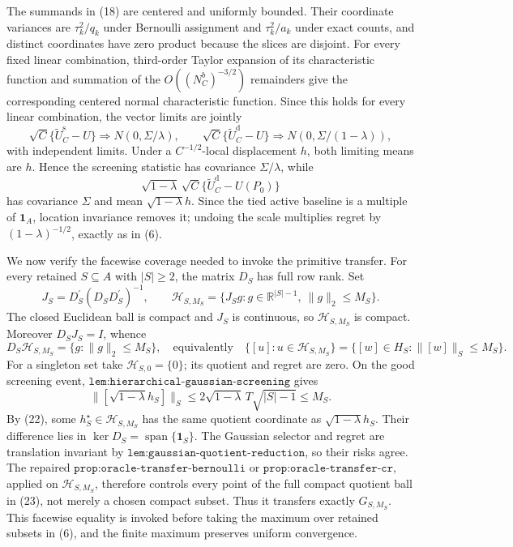 The summands in (18) are centered and uniformly bounded.  Their coordinate variances are \(\tau_k^2/q_k\) under Bernoulli assignment and \(\tau_k^2/a_k\) under exact counts, and distinct coordinates have zero product because the slices are disjoint.  For every fixed linear combination, third-order Taylor expansion of its characteristic function and summation of the \(O((N_C^b)^{-3/2})\) remainders give the corresponding centered normal characteristic function.  Since this holds for every linear combination, the vector limits are jointly
\[
\sqrt C\{\widetilde U_C^{\mathrm s}-U\}
\Rightarrow N(0,\Sigma/\lambda),
\qquad
\sqrt C\{\widetilde U_C^{\mathrm d}-U\}
\Rightarrow N(0,\Sigma/(1-\lambda)),                             \tag{19}
\]
with independent limits.  Under a \(C^{-1/2}\)-local displacement \(h\), both limiting means are \(h\).  Hence the screening statistic has covariance \(\Sigma/\lambda\), while
\[
\sqrt{1-\lambda}\,\sqrt C
\{\widetilde U_C^{\mathrm d}-U(P_0)\}                             \tag{20}
\]
has covariance \(\Sigma\) and mean \(\sqrt{1-\lambda}h\).  Since the tied active baseline is a multiple of \(\mathbf1_A\), location invariance removes it; undoing the scale multiplies regret by \((1-\lambda)^{-1/2}\), exactly as in (6).

We now verify the facewise coverage needed to invoke the primitive transfer.  For every retained \(S\subseteq A\) with \(|S|\geq2\), the matrix \(D_S\) has full row rank.  Set
\[
J_S=D_S^{\prime}(D_SD_S^{\prime})^{-1},
\qquad
\mathscr H_{S,M_S}=\{J_Sg:g\in\mathbb R^{|S|-1},\ \lVert g\rVert_2\leq M_S\}.             \tag{21}
\]
The closed Euclidean ball is compact and \(J_S\) is continuous, so \(\mathscr H_{S,M_S}\) is compact.  Moreover \(D_SJ_S=I\), whence
\[
D_S\mathscr H_{S,M_S}=\{g:\lVert g\rVert_2\leq M_S\},
\quad\text{equivalently}\quad
\{[u]:u\in\mathscr H_{S,M_S}\}
=\{[w]\in H_S:\lVert[w]\rVert_S\leq M_S\}.                     \tag{22}
\]
For a singleton set take \(\mathscr H_{S,0}=\{0\}\); its quotient and regret are zero.  On the good screening event, \(\texttt{lem:hierarchical-gaussian-screening}\) gives
\[
\lVert[\sqrt{1-\lambda}h_S]\rVert_S
\leq2\sqrt{1-\lambda}\,T\sqrt{|S|-1}\leq M_S.                  \tag{23}
\]
By (22), some \(h_S^\star\in\mathscr H_{S,M_S}\) has the same quotient coordinate as \(\sqrt{1-\lambda}h_S\).  Their difference lies in \(\ker D_S=\operatorname{span}\{\mathbf1_S\}\).  The Gaussian selector and regret are translation invariant by \(\texttt{lem:gaussian-quotient-reduction}\), so their risks agree.  The repaired \(\texttt{prop:oracle-transfer-bernoulli}\) or \(\texttt{prop:oracle-transfer-cr}\), applied on \(\mathscr H_{S,M_S}\), therefore controls every point of the full compact quotient ball in (23), not merely a chosen compact subset.  Thus it transfers exactly \(G_{S,M_S}\).  This facewise equality is invoked before taking the maximum over retained subsets in (6), and the finite maximum preserves uniform convergence.

